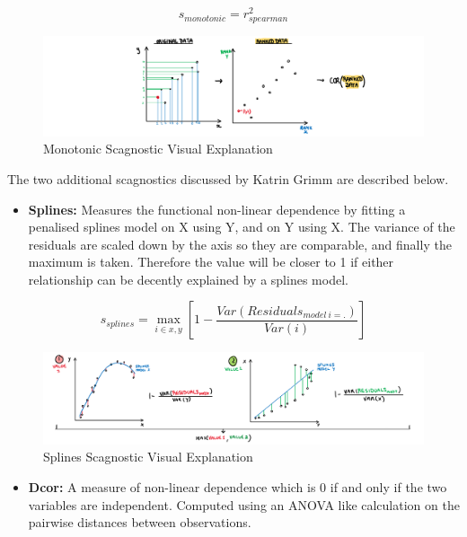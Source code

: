 \[s_{monotonic} = r^2_{spearman}\]

\begin{Schunk}
\begin{figure}
\includegraphics[width=1\linewidth,height=0.2\textheight]{figures/drawmonotonic} \caption[Monotonic Scagnostic Visual Explanation]{Monotonic Scagnostic Visual Explanation}\label{fig:monotonicscag}
\end{figure}
\end{Schunk}

The two additional scagnostics discussed by Katrin Grimm are described
below.

\begin{itemize}
\tightlist
\item
  \textbf{Splines:} Measures the functional non-linear dependence by
  fitting a penalised splines model on X using Y, and on Y using X. The
  variance of the residuals are scaled down by the axis so they are
  comparable, and finally the maximum is taken. Therefore the value will
  be closer to 1 if either relationship can be decently explained by a
  splines model.
\end{itemize}

\[s_{splines}=\max_{i\in x,y}[1-\frac{Var(Residuals_{model~i=.})}{Var(i)}]\]

\begin{Schunk}
\begin{figure}
\includegraphics[width=1\linewidth,height=0.2\textheight]{figures/drawsplines} \caption[Splines Scagnostic Visual Explanation]{Splines Scagnostic Visual Explanation}\label{fig:splinescag}
\end{figure}
\end{Schunk}

\begin{itemize}
\tightlist
\item
  \textbf{Dcor:} A measure of non-linear dependence which is 0 if and
  only if the two variables are independent. Computed using an ANOVA
  like calculation on the pairwise distances between observations.
\end{itemize}

